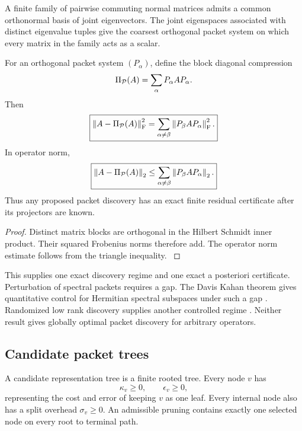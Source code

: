 \begin{standardfact}\label{main:standardfact:004}\label{fact:simultaneous}
A finite family of pairwise commuting normal matrices admits a common orthonormal basis of joint eigenvectors. The joint eigenspaces associated with distinct eigenvalue tuples give the coarsest orthogonal packet system on which every matrix in the family acts as a scalar.
\end{standardfact}

\begin{proposition}\label{main:proposition:008}\label{prop:block_discovery_certificate}
For an orthogonal packet system \((P_\alpha)\), define the block diagonal compression
\[
\Pi_{\Pcal}(A)
=
\sum_\alpha P_\alpha AP_\alpha.
\]
Then
\[
\boxed{
\norm{A-\Pi_{\Pcal}(A)}_{\rm F}^2
=
\sum_{\alpha\neq\beta}
\norm{P_\beta AP_\alpha}_{\rm F}^2.
}
\]
In operator norm,
\[
\boxed{
\norm{A-\Pi_{\Pcal}(A)}_2
\leq
\sum_{\alpha\neq\beta}
\norm{P_\beta AP_\alpha}_2.
}
\]
Thus any proposed packet discovery has an exact finite residual certificate after its projectors are known.
\end{proposition}

\begin{proof}\label{main:proof:042}
Distinct matrix blocks are orthogonal in the Hilbert Schmidt inner product. Their squared Frobenius norms therefore add. The operator norm estimate follows from the triangle inequality.
\label{main:proof:042:end}\end{proof}

This supplies one exact discovery regime and one exact a posteriori certificate. Perturbation of spectral packets requires a gap. The Davis Kahan theorem gives quantitative control for Hermitian spectral subspaces under such a gap \cite{DavisKahan1970}. Randomized low rank discovery supplies another controlled regime \cite{HalkoMartinssonTropp2011,MartinssonTropp2020}. Neither result gives globally optimal packet discovery for arbitrary operators.

\subsection{Candidate packet trees}\label{main:subsection:013}

\begin{definition}\label{main:definition:012}\label{def:candidate_tree}
A candidate representation tree is a finite rooted tree. Every node \(v\) has
\[
\kappa_v\geq0,
\qquad
\epsilon_v\geq0,
\]
representing the cost and error of keeping \(v\) as one leaf. Every internal node also has a split overhead \(\sigma_v\geq0\). An admissible pruning contains exactly one selected node on every root to terminal path.
\end{definition}

